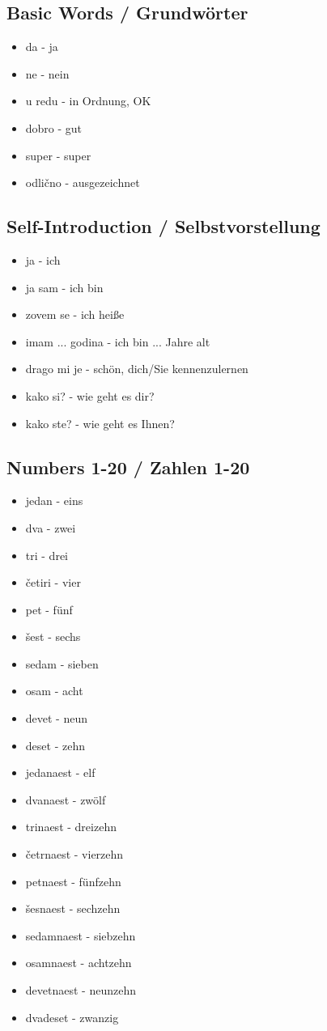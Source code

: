 \subsection*{Basic Words / Grundwörter}
\begin{itemize}
    \item da - ja
    \item ne - nein
    \item u redu - in Ordnung, OK
    \item dobro - gut
    \item super - super
    \item odlično - ausgezeichnet
\end{itemize}

\subsection*{Self-Introduction / Selbstvorstellung}
\begin{itemize}
    \item ja - ich
    \item ja sam - ich bin
    \item zovem se - ich heiße
    \item imam ... godina - ich bin ... Jahre alt
    \item drago mi je - schön, dich/Sie kennenzulernen
    \item kako si? - wie geht es dir?
    \item kako ste? - wie geht es Ihnen?
\end{itemize}

\subsection*{Numbers 1-20 / Zahlen 1-20}
\begin{itemize}
    \item jedan - eins
    \item dva - zwei
    \item tri - drei
    \item četiri - vier
    \item pet - fünf
    \item šest - sechs
    \item sedam - sieben
    \item osam - acht
    \item devet - neun
    \item deset - zehn
    \item jedanaest - elf
    \item dvanaest - zwölf
    \item trinaest - dreizehn
    \item četrnaest - vierzehn
    \item petnaest - fünfzehn
    \item šesnaest - sechzehn
    \item sedamnaest - siebzehn
    \item osamnaest - achtzehn
    \item devetnaest - neunzehn
    \item dvadeset - zwanzig
\end{itemize}

